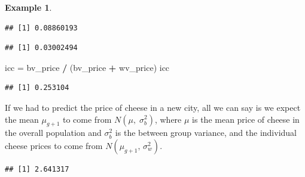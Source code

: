 \documentclass[
  openany]{book}
\newenvironment{Shaded}{\begin{snugshade}}{\end{snugshade}}
\newcommand{\FunctionTok}[1]{\textcolor[rgb]{0.13,0.29,0.53}{\textbf{#1}}}
\newcommand{\NormalTok}[1]{#1}
\newcommand{\OtherTok}[1]{\textcolor[rgb]{0.56,0.35,0.01}{#1}}
\newcommand{\SpecialCharTok}[1]{\textcolor[rgb]{0.81,0.36,0.00}{\textbf{#1}}}
\theoremstyle{definition}
\theoremstyle{definition}
\newtheorem{example}{Example}[chapter]
\theoremstyle{definition}
\theoremstyle{definition}
\theoremstyle{remark}
\begin{document}
\begin{example}
\begin{Shaded}
\end{Shaded}

\begin{verbatim}
## [1] 0.08860193
\end{verbatim}

\begin{Shaded}
\end{Shaded}

\begin{verbatim}
## [1] 0.03002494
\end{verbatim}

\begin{Shaded}
\begin{Highlighting}[]
\NormalTok{icc }\OtherTok{=}\NormalTok{ bv\_price }\SpecialCharTok{/}\NormalTok{ (bv\_price }\SpecialCharTok{+}\NormalTok{ wv\_price)}
\NormalTok{icc}
\end{Highlighting}
\end{Shaded}

\begin{verbatim}
## [1] 0.253104
\end{verbatim}

If we had to predict the price of cheese in a new city, all we can say is we expect the mean \(\mu_{g+1}\) to come from \(N\left(\mu,\;\sigma^2_b\right)\), where \(\mu\) is the mean price of cheese in the overall population and \(\sigma^2_b\) is the between group variance, and the individual cheese prices to come from \(N\left(\mu_{g+1},\,\sigma^2_w\right)\).

\begin{Shaded}
\end{Shaded}

\begin{verbatim}
## [1] 2.641317
\end{verbatim}

\end{example}
\end{document}
